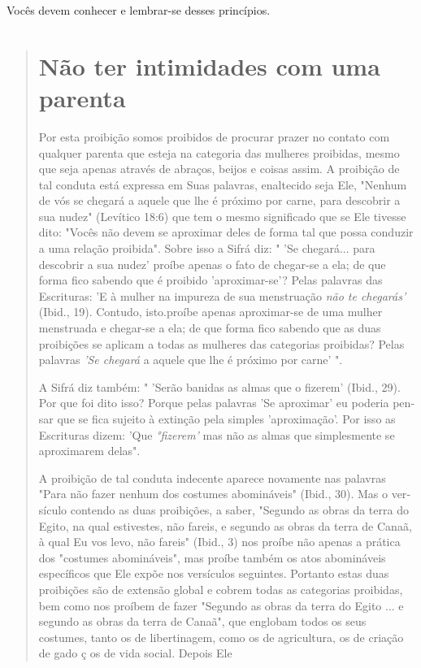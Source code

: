 Vocês devem conhecer e lembrar-se desses princípios.

\begin{quote}
\section{Não ter intimidades com uma parenta}

Por esta proibição somos proibidos de procurar prazer no contato com
qualquer parenta que esteja na categoria das mulheres proibidas, mesmo
que seja apenas através de abraços, beijos e coisas assim. A proibição
de tal con­duta está expressa em Suas palavras, enaltecido seja Ele,
"Nenhum de vós se chegará a aquele que lhe é próximo por carne, para
descobrir a sua nudez" (Le­vítico 18:6) que tem o mesmo significado que
se Ele tivesse dito: "Vocês não devem se aproximar deles de forma tal
que possa conduzir a uma relação proi­bida". Sobre isso a Sifrá diz: "
'Se chegará... para descobrir a sua nudez' proíbe apenas o fato de
chegar-se a ela; de que forma fico sabendo que é proibido
'aproximar-se'? Pelas palavras das Escrituras: 'E à mulher na impureza
de sua menstruação \emph{não te chegarás'} (Ibid., 19). Contudo,
isto.proíbe apenas aproximar-se de uma mulher menstruada e chegar-se a
ela; de que forma fico sabendo que as duas proibições se aplicam a todas
as mulheres das categorias proibidas? Pe­las palavras \emph{'Se chegará}
a aquele que lhe é próximo por carne' ".

A Sifrá diz também: " 'Serão banidas as almas que o fizerem' (Ibid.,
29). Por que foi dito isso? Porque pelas palavras 'Se aproximar' eu
poderia pen­sar que se fica sujeito à extinção pela simples
'aproximação'. Por isso as Escri­turas dizem: 'Que \emph{°fizerem'} mas
não as almas que simplesmente se aproxima­rem delas".

A proibição de tal conduta indecente aparece novamente nas pala­vras
"Para não fazer nenhum dos costumes abomináveis" (Ibid., 30). Mas o
ver­sículo contendo as duas proibições, a saber, "Segundo as obras da
terra do Egi­to, na qual estivestes, não fareis, e segundo as obras da
terra de Canaã, à qual Eu vos levo, não fareis" (Ibid., 3) nos proíbe
não apenas a prática dos "costu­mes abomináveis", mas proíbe também os
atos abomináveis específicos que Ele expõe nos versículos seguintes.
Portanto estas duas proibições são de ex­tensão global e cobrem todas as
categorias proibidas, bem como nos proíbem de fazer "Segundo as obras da
terra do Egito ... e segundo as obras da terra de Canaã", que englobam
todos os seus costumes, tanto os de libertinagem, como os de
agricultura, os de criação de gado ç os de vida social. Depois Ele
\end{quote}

